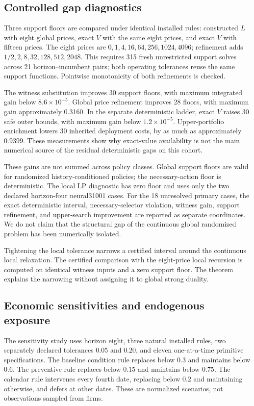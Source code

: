 \subsection{Controlled gap diagnostics}\label{sec:gaps}

Three support floors are compared under identical installed rules: constructed $L$ with eight global prices, exact $V$ with the same eight prices, and exact $V$ with fifteen prices. The eight prices are $0,1,4,16,64,256,1024,4096$; refinement adds $1/2,2,8,32,128,512,2048$. This requires 315 fresh unrestricted support solves across 21 horizon--incumbent pairs; both operating tolerances reuse the same support functions. Pointwise monotonicity of both refinements is checked.

The witness substitution improves 30 support floors, with maximum integrated gain below $8.6\times10^{-5}$. Global price refinement improves 28 floors, with maximum gain approximately 0.3160. In the separate deterministic ladder, exact $V$ raises 30 safe outer bounds, with maximum gain below $1.2\times10^{-5}$. Upper-portfolio enrichment lowers 30 inherited deployment costs, by as much as approximately 0.9399. These measurements show why exact-value availability is not the main numerical source of the residual deterministic gaps on this cohort.

These gains are not summed across policy classes. Global support floors are valid for randomized history-conditioned policies; the necessary-action floor is deterministic. The local LP diagnostic has zero floor and uses only the two declared horizon-four neural31001 cases. For the 18 unresolved primary cases, the exact deterministic interval, necessary-selector violation, witness gain, support refinement, and upper-search improvement are reported as separate coordinates. We do not claim that the structural gap of the continuous global randomized problem has been numerically isolated.


Tightening the local tolerance narrows a certified interval around the continuous local relaxation. The certified comparison with the eight-price local recursion is computed on identical witness inputs and a zero support floor. The theorem explains the narrowing without assigning it to global strong duality.

\subsection{Economic sensitivities and endogenous exposure}\label{sec:sensitivity}
The sensitivity study uses horizon eight, three natural installed rules, two separately declared tolerances $0.05$ and $0.20$, and eleven one-at-a-time primitive specifications. The baseline condition rule replaces below $0.3$ and maintains below $0.6$. The preventive rule replaces below $0.15$ and maintains below $0.75$. The calendar rule intervenes every fourth date, replacing below $0.2$ and maintaining otherwise, and defers at other dates. These are normalized scenarios, not observations sampled from firms.

